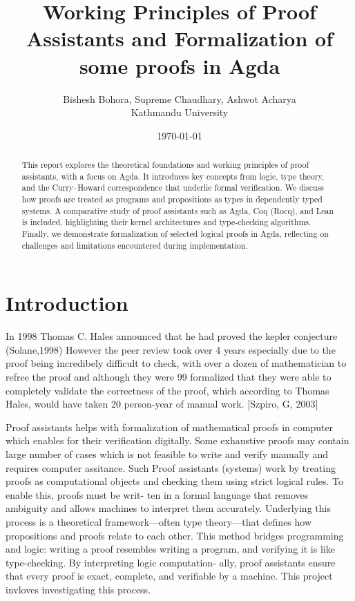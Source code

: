 \documentclass[12pt]{article}
\title{Working Principles of Proof Assistants and Formalization of some proofs in Agda}
\author{Bishesh Bohora, Supreme Chaudhary, Ashwot Acharya \\
\small Kathmandu University 
\small \texttt{}
}
\date{\today}
\begin{document}
\maketitle

\clearpage
\section*{}

\begin{abstract}
This report explores the theoretical foundations and working principles of proof assistants, with a focus on Agda. It introduces key concepts from logic, type theory, and the Curry–Howard correspondence that underlie formal verification. We discuss how proofs are treated as programs and propositions as types in dependently typed systems. A comparative study of proof assistants such as Agda, Coq (Rocq), and Lean is included, highlighting their kernel architectures and type-checking algorithms. Finally, we demonstrate formalization of selected logical proofs in Agda, reflecting on challenges and limitations encountered during implementation.
\end{abstract}
\clearpage

\tableofcontents
\newpage

\section{Introduction}

In 1998 Thomas C. Hales announced that he had proved the kepler conjecture
(Solane,1998) However the peer review took over 4 years especially due to the proof
being incredibely difficult to check, with over a dozen of mathematician to refree
the proof and although they were 99%
formalized that they were able to completely validate the correctness of the proof,
which according to Thomas Hales, would have taken 20 person-year of manual work.
[Szpiro, G, 2003]

Proof assistants helps with formalization of mathematical proofs in computer which
enables for their verification digitally. Some exhaustive proofs may contain large
number of cases which is not feasible to write and verify manually and requires
computer assitance.
Such Proof assistants (systems) work by treating proofs as computational objects
and checking them using strict logical rules. To enable this, proofs must be writ-
ten in a formal language that removes ambiguity and allows machines to interpret
them accurately. Underlying this process is a theoretical framework—often type
theory—that defines how propositions and proofs relate to each other.
This method bridges programming and logic: writing a proof resembles writing a
program, and verifying it is like type-checking. By interpreting logic computation-
ally, proof assistants ensure that every proof is exact, complete, and verifiable by
a machine. This project invloves investigating this process. 
\end{document}
